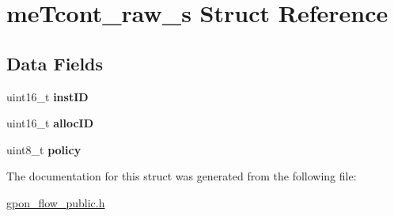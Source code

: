 \hypertarget{structmeTcont__raw__s}{}\section{me\+Tcont\+\_\+raw\+\_\+s Struct Reference}
\label{structmeTcont__raw__s}
\subsection*{Data Fields}
\begin{DoxyCompactItemize}
\item 
\mbox{\label{structmeTcont__raw__s_a49f0d07e4a9ec9af334999879d3b6f63}} 
uint16\+\_\+t {\bfseries inst\+ID}
\item 
\mbox{\label{structmeTcont__raw__s_adb3eb24d6741a16cb876e93d44b8a276}} 
uint16\+\_\+t {\bfseries alloc\+ID}
\item 
\mbox{\label{structmeTcont__raw__s_ae751d43179767e06b00ddda744b2ef02}} 
uint8\+\_\+t {\bfseries policy}
\end{DoxyCompactItemize}


The documentation for this struct was generated from the following file\+:\begin{DoxyCompactItemize}
\item 
\hyperlink{gpon__flow__public_8h}{gpon\+\_\+flow\+\_\+public.\+h}\end{DoxyCompactItemize}
